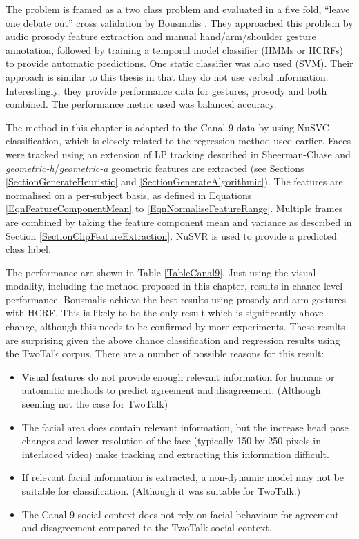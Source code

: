 The problem is framed as a two class problem and evaluated in a five fold, ``leave one debate out'' cross validation by Bousmalis \etal \cite{Bousmalis2011}. They approached this problem by audio prosody feature extraction and manual hand/arm/shoulder gesture annotation, followed by training a temporal model classifier (\ac{HMM}s or \ac{HCRF}s) to provide automatic predictions. One static classifier was also used (\ac{SVM}). Their approach is similar to this thesis in that they do not use verbal information. Interestingly, they provide performance data for gestures, prosody and both combined. The performance metric used was balanced accuracy.

The method in this chapter is adapted to the Canal 9 data by using NuSVC\cite{Scholkopf2000} classification, which is closely related to the regression method used earlier. Faces were tracked using an extension of \ac{LP} tracking described in Sheerman-Chase \etal \cite{SheermanChase2013} and \textit{geometric-h}/\textit{geometric-a} geometric features are extracted (see Sections \ref{SectionGenerateHeuristic} and \ref{SectionGenerateAlgorithmic}). The features are normalised on a per-subject basis, as defined in Equations \ref{EqnFeatureComponentMean} to \ref{EqnNormaliseFeatureRange}. Multiple frames are combined by taking the feature component mean and variance as described in Section \ref{SectionClipFeatureExtraction}. NuSVR is used to provide a predicted class label.

The performance are shown in Table \ref{TableCanal9}. Just using the visual modality, including the method proposed in this chapter, results in chance level performance. Bousmalis \etal achieve the best results using prosody and arm gestures with \ac{HCRF}. This is likely to be the only result which is significantly above change, although this needs to be confirmed by more experiments. These results are surprising given the above chance classification and regression results using the TwoTalk corpus. There are a number of possible reasons for this result:

\begin{itemize}
 \item Visual features do not provide enough relevant information for humans or automatic methods to predict agreement and disagreement. (Although seeming not the case for TwoTalk)
 \item The facial area does contain relevant information, but the increase head pose changes and lower resolution of the face (typically 150 by 250 pixels in interlaced video) make tracking and extracting this information difficult.
 \item If relevant facial information is extracted, a non-dynamic model may not be suitable for classification. (Although it was suitable for TwoTalk.)
 \item The Canal 9 social context does not rely on facial behaviour for agreement and disagreement compared to the TwoTalk social context.
\end{itemize}

